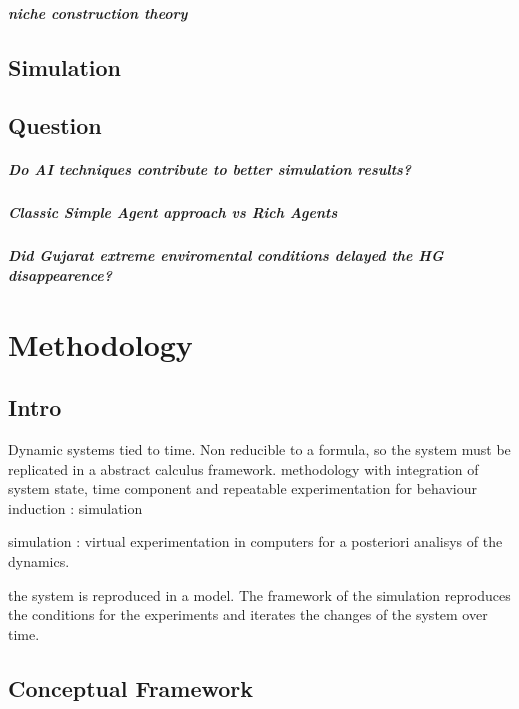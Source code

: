 \documentclass{report}
\begin{document}
			\paragraph{niche construction theory}
			
	\section{Simulation}
	
	\section{Question}
			\paragraph{Do AI techniques contribute to better simulation results?}
			\paragraph{Classic Simple Agent approach vs Rich Agents}
			\paragraph{Did Gujarat extreme enviromental conditions delayed the HG disappearence?}
			
\newpage 
\chapter{Methodology}
	\section{Intro}
Dynamic systems tied to time. Non reducible to a formula, so the system must be replicated
in a abstract calculus framework.  methodology with integration of system state, time component
and repeatable experimentation for behaviour induction : simulation

simulation : virtual experimentation in computers for a posteriori analisys of the dynamics.

the system is reproduced in a model. The framework of the simulation reproduces the conditions
for the experiments and iterates the changes of the system over time.

	\section{Conceptual Framework}
\end{document}
